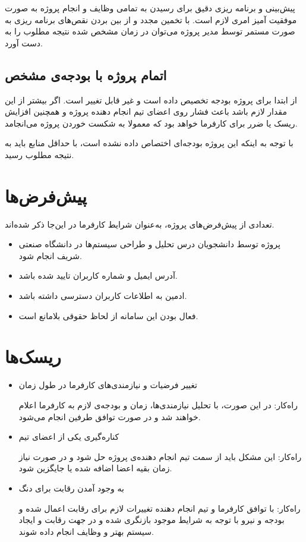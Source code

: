 پیش‌بینی و برنامه ریزی دقیق برای رسیدن به تمامی وظایف و انجام پروژه به صورت موفقیت آمیز امری لازم است. با تخمین مجدد و از بین بردن نقص‌های برنامه ریزی به صورت مستمر توسط مدیر پروژه می‌توان در زمان مشخص شده نتیجه مطلوب را به دست آورد.

\subsection{اتمام پروژه با بودجه‌ی مشخص}
از ابتدا برای پروژه بودجه تخصیص داده است و غیر قابل تغییر است. اگر بیشتر از این مقدار لازم باشد باعث فشار روی اعضای تیم انجام دهنده پروژه و همچنین افزایش ریسک یا ضرر برای کارفرما خواهد بود که معمولا به شکست خوردن پروژه می‌انجامد.

با توجه به اینکه این پروژه بودجه‌ای اختصاص داده نشده است، با حداقل منابع باید به نتیجه مطلوب رسید.

\section{پیش‌فرض‌ها}
تعدادی از پیش‌فرض‌های پروژه، به‌عنوان شرایط کارفرما در این‌جا ذکر شده‌اند. 
\begin{itemize}
	\item
	پروژه توسط دانشجویان درس تحلیل و طراحی سیستم‌ها در دانشگاه صنعتی شریف انجام شود.
	\item
	آدرس ایمیل و شماره کاربران تایید شده باشد.
	\item 
	ادمین به اطلاعات کاربران دسترسی داشته باشد. 
	\item 
	فعال بودن این سامانه از لحاظ حقوقی بلامانع است.
\end{itemize}

\section{ریسک‌ها}

\begin{itemize}
	\item 
	تغییر فرضیات و نیازمندی‌های کارفرما در طول زمان
	
	راه‌کار:‌ در این صورت، با تحلیل نیازمندی‌ها، زمان و بودجه‌ی لازم به کارفرما اعلام خواهند شد و در صورت توافق طرفین انجام می‌شود.
	\item
	کناره‌گیری یکی از اعضای تیم
	
	راه‌کار: این مشکل باید از سمت تیم انجام دهنده‌ی پروژه حل شود و در صورت نیاز زمان بقیه اعضا اضافه شده یا جایگزین شود.
	\item 
	به وجود آمدن رقابت برای دنگ
	
	راه‌کار:‌ با توافق کارفرما و تیم انجام دهنده تغییرات لازم برای رقابت اعمال شده و بودجه و نیرو با توجه به شرایط موجود بازنگری شده و در جهت رقابت و ایجاد سیستم بهتر و وظایف انجام داده شوند. 
\end{itemize}

